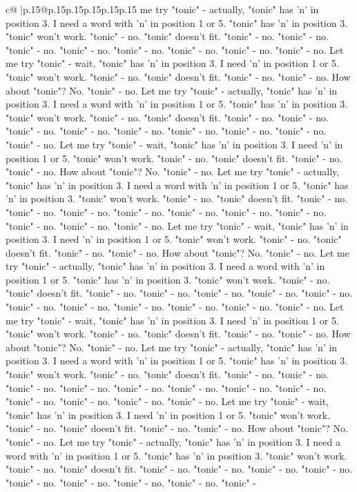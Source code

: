 \documentclass{article}
\begin{document}
{\begin{supertabular}{c@{$\;$}|p{.15\linewidth}@{}p{.15\linewidth}p{.15\linewidth}p{.15\linewidth}p{.15\linewidth}p{.15\linewidth}}
{{{me try "tonic" {-} actually, "tonic" has 'n' in position 3. I need a word with 'n' in position 1 or 5. "tonic" has 'n' in position 3. "tonic" won't work. "tonic" {-} no. "tonic" doesn't fit. "tonic" {-} no. "tonic" {-} no. "tonic" {-} no. "tonic" {-} no. "tonic" {-} no. "tonic" {-} no. "tonic" {-} no. "tonic" {-} no. Let me try "tonic" {-} wait, "tonic" has 'n' in position 3. I need 'n' in position 1 or 5. "tonic" won't work. "tonic" {-} no. "tonic" doesn't fit. "tonic" {-} no. "tonic" {-} no. How about "tonic"? No. "tonic" {-} no. Let me try "tonic" {-} actually, "tonic" has 'n' in position 3. I need a word with 'n' in position 1 or 5. "tonic" has 'n' in position 3. "tonic" won't work. "tonic" {-} no. "tonic" doesn't fit. "tonic" {-} no. "tonic" {-} no. "tonic" {-} no. "tonic" {-} no. "tonic" {-} no. "tonic" {-} no. "tonic" {-} no. "tonic" {-} no. "tonic" {-} no. Let me try "tonic" {-} wait, "tonic" has 'n' in position 3. I need 'n' in position 1 or 5. "tonic" won't work. "tonic" {-} no. "tonic" doesn't fit. "tonic" {-} no. "tonic" {-} no. How about "tonic"? No. "tonic" {-} no. Let me try "tonic" {-} actually, "tonic" has 'n' in position 3. I need a word with 'n' in position 1 or 5. "tonic" has 'n' in position 3. "tonic" won't work. "tonic" {-} no. "tonic" doesn't fit. "tonic" {-} no. "tonic" {-} no. "tonic" {-} no. "tonic" {-} no. "tonic" {-} no. "tonic" {-} no. "tonic" {-} no. "tonic" {-} no. "tonic" {-} no. "tonic" {-} no. Let me try "tonic" {-} wait, "tonic" has 'n' in position 3. I need 'n' in position 1 or 5. "tonic" won't work. "tonic" {-} no. "tonic" doesn't fit. "tonic" {-} no. "tonic" {-} no. How about "tonic"? No. "tonic" {-} no. Let me try "tonic" {-} actually, "tonic" has 'n' in position 3. I need a word with 'n' in position 1 or 5. "tonic" has 'n' in position 3. "tonic" won't work. "tonic" {-} no. "tonic" doesn't fit. "tonic" {-} no. "tonic" {-} no. "tonic" {-} no. "tonic" {-} no. "tonic" {-} no. "tonic" {-} no. "tonic" {-} no. "tonic" {-} no. "tonic" {-} no. "tonic" {-} no. "tonic" {-} no. Let me try "tonic" {-} wait, "tonic" has 'n' in position 3. I need 'n' in position 1 or 5. "tonic" won't work. "tonic" {-} no. "tonic" doesn't fit. "tonic" {-} no. "tonic" {-} no. How about "tonic"? No. "tonic" {-} no. Let me try "tonic" {-} actually, "tonic" has 'n' in position 3. I need a word with 'n' in position 1 or 5. "tonic" has 'n' in position 3. "tonic" won't work. "tonic" {-} no. "tonic" doesn't fit. "tonic" {-} no. "tonic" {-} no. "tonic" {-} no. "tonic" {-} no. "tonic" {-} no. "tonic" {-} no. "tonic" {-} no. "tonic" {-} no. "tonic" {-} no. "tonic" {-} no. "tonic" {-} no. "tonic" {-} no. Let me try "tonic" {-} wait, "tonic" has 'n' in position 3. I need 'n' in position 1 or 5. "tonic" won't work. "tonic" {-} no. "tonic" doesn't fit. "tonic" {-} no. "tonic" {-} no. How about "tonic"? No. "tonic" {-} no. Let me try "tonic" {-} actually, "tonic" has 'n' in position 3. I need a word with 'n' in position 1 or 5. "tonic" has 'n' in position 3. "tonic" won't work. "tonic" {-} no. "tonic" doesn't fit. "tonic" {-} no. "tonic" {-} no. "tonic" {-} no. "tonic" {-} no. "tonic" {-} no. "tonic" {-} no. "tonic" {-} no. "tonic" {-} no. "tonic" {-} }}}
\end{supertabular}}
\end{document}
